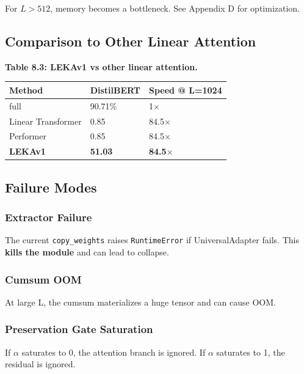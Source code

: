 For $L > 512$, memory becomes a bottleneck. See Appendix D for 
optimization.

\subsection{Comparison to Other Linear Attention}

\textbf{Table 8.3: LEKAv1 vs other linear attention.}

\begin{table}[H]
\centering
\small
\begin{tabular}{lll}
\toprule
\textbf{Method} & \textbf{DistilBERT} & \textbf{Speed @ L=1024} \\
\midrule
full & 90.71\% & 1$\times$ \\
Linear Transformer & 0.85 & 84.5$\times$ \\
Performer & 0.85 & 84.5$\times$ \\
\textbf{LEKAv1} & \textbf{51.03} & \textbf{84.5$\times$} \\
\bottomrule
\end{tabular}
\end{table}

\subsection{Failure Modes}

\subsubsection{Extractor Failure}

The current \texttt{copy\_weights} raises \texttt{RuntimeError} if UniversalAdapter fails. 
This \textbf{kills the module} and can lead to collapse.

\subsubsection{Cumsum OOM}

At large L, the cumsum materializes a huge tensor and can cause OOM.

\subsubsection{Preservation Gate Saturation}

If $\alpha$ saturates to 0, the attention branch is ignored. If $\alpha$ saturates to 1, 
the residual is ignored.

